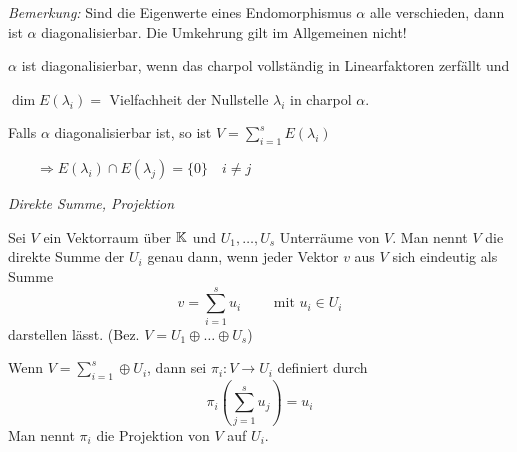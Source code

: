 \textit{Bemerkung:}
    Sind die Eigenwerte eines Endomorphismus $\alpha$ alle verschieden, dann ist $\alpha$ diagonalisierbar. Die Umkehrung gilt im Allgemeinen nicht! 
    \par\medskip
    $\alpha$ ist diagonalisierbar, wenn das charpol vollständig in Linearfaktoren zerfällt und \par $\dim E(\lambda_i)=$ Vielfachheit der Nullstelle 
    $\lambda_i$ in charpol $\alpha$. \par \medskip
    Falls $\alpha$ diagonalisierbar ist, so ist $\displaystyle{V=\sum_{i=1}^s E(\lambda_i)}$\par
    $\qquad \Rightarrow E(\lambda_i) \cap E(\lambda_j) = \lbrace 0 \rbrace \quad i\neq j$

\begin{mydef} \textit{Direkte Summe, Projektion} \par
    Sei $V$ ein Vektorraum über $\mathbb{K}$ und $U_1,\ldots,U_s$ Unterräume von $V$. Man nennt $V$ die direkte Summe der $U_i$ genau dann, wenn jeder Vektor 
    $v$ aus $V$ sich eindeutig als Summe
    \begin{equation*}
        v=\sum_{i=1}^s u_i \qquad \mbox{ mit } u_i\in U_i
    \end{equation*}
    darstellen lässt. (Bez. $V=U_1\oplus\ldots\oplus U_s$)\par \medskip
    Wenn $\displaystyle{V=\sum_{i=1}^s \oplus U_i}$, dann sei $\pi_i:V\rightarrow U_i$ definiert durch
    \begin{equation*}
        \pi_i\left(\sum_{j=1}^s u_j\right) = u_i
    \end{equation*}
    Man nennt $\pi_i$ die Projektion von $V$ auf $U_i$.
\end{mydef}



